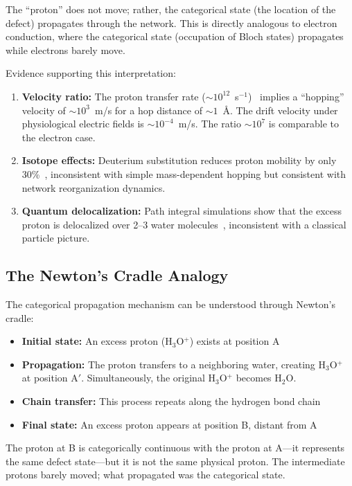 \documentclass[twocolumn,showpacs,preprintnumbers,amsmath,amssymb,prd]{revtex4-2}
\begin{document}
The ``proton'' does not move; rather, the categorical state (the location of the defect) propagates through the network. This is directly analogous to electron conduction, where the categorical state (occupation of Bloch states) propagates while electrons barely move.

Evidence supporting this interpretation:

\begin{enumerate}
\item \textbf{Velocity ratio:} The proton transfer rate ($\sim 10^{12}$~s$^{-1}$)~\cite{Marx2006} implies a ``hopping'' velocity of $\sim 10^{3}$~m/s for a hop distance of $\sim 1$~\AA{}. The drift velocity under physiological electric fields is $\sim 10^{-4}$~m/s. The ratio $\sim 10^7$ is comparable to the electron case.

\item \textbf{Isotope effects:} Deuterium substitution reduces proton mobility by only 30\%~\cite{Atkins2014}, inconsistent with simple mass-dependent hopping but consistent with network reorganization dynamics.

\item \textbf{Quantum delocalization:} Path integral simulations show that the excess proton is delocalized over 2--3 water molecules~\cite{Marx1999}, inconsistent with a classical particle picture.
\end{enumerate}

\subsection{The Newton's Cradle Analogy}

The categorical propagation mechanism can be understood through Newton's cradle:

\begin{itemize}
\item \textbf{Initial state:} An excess proton (H$_3$O$^+$) exists at position A
\item \textbf{Propagation:} The proton transfers to a neighboring water, creating H$_3$O$^+$ at position A$'$. Simultaneously, the original H$_3$O$^+$ becomes H$_2$O.
\item \textbf{Chain transfer:} This process repeats along the hydrogen bond chain
\item \textbf{Final state:} An excess proton appears at position B, distant from A
\end{itemize}

The proton at B is categorically continuous with the proton at A---it represents the same defect state---but it is not the same physical proton. The intermediate protons barely moved; what propagated was the categorical state.
\end{document}
